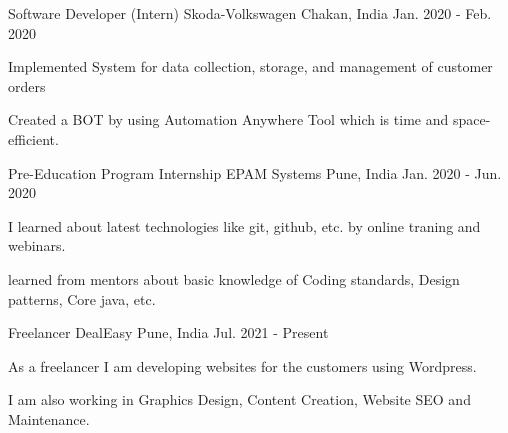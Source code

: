 

\begin{cventries}

  \cventry
    {Software Developer (Intern)} %
    {Skoda-Volkswagen} %
    {Chakan, India} %
    {Jan. 2020 - Feb. 2020} %
    {
      \begin{cvitems} %
        \item {Implemented System for data collection, storage, and management of customer orders}
        \item {Created a BOT by using Automation Anywhere Tool which is time and space-efficient.}
      \end{cvitems}
    }


  \cventry
    {Pre-Education Program Internship} %
    {EPAM Systems} %
    {Pune, India} %
    {Jan. 2020 - Jun. 2020} %
    {
      \begin{cvitems} %
        \item {I learned about latest technologies like git, github, etc. by online traning and webinars.}
        \item {learned from mentors about basic knowledge of Coding standards, Design patterns, Core java, etc.}
      \end{cvitems}
    }

  \cventry
    {Freelancer} %
    {DealEasy} %
    {Pune, India} %
    {Jul. 2021 - Present} %
    {
      \begin{cvitems} %
        \item {As a freelancer I am developing websites for the customers using Wordpress.}
        \item {I am also working in Graphics Design, Content Creation, Website SEO and Maintenance.}
      \end{cvitems}
    }


\end{cventries}
